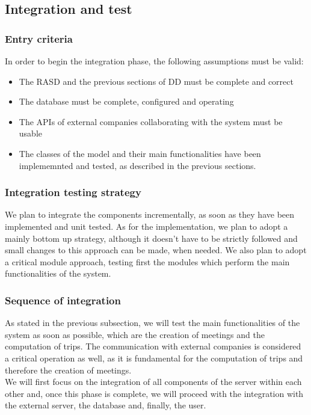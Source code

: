 \documentclass[a4paper,leqno]{article}
\begin{document}
\newpage
\subsection{Integration and test}

\subsubsection{Entry criteria}
In order to begin the integration phase, the following assumptions must be valid:

\begin{itemize}
	\item The RASD and the previous sections of DD must be complete and correct
	\item The database must be complete, configured and operating
	\item The APIs of external companies collaborating with the system must be usable
	\item The classes of the model and their main functionalities have been implememnted and tested, as described in the previous sections.
\end{itemize}

\subsubsection{Integration testing strategy}
We plan to integrate the components incrementally, as soon as they have been implemented and unit tested. As for the implementation, we plan to adopt a mainly bottom up strategy, although it doesn't have to be strictly followed and small changes to this approach can be made, when needed.
We also plan to adopt a critical module approach, testing first the modules which perform the main functionalities of the system.

\subsubsection{Sequence of integration}
As stated in the previous subsection, we will test the main functionalities of the system as soon as possible, which are the creation of meetings and the computation of trips. The communication with external companies is considered a critical operation as well, as it is fundamental for the computation of trips and therefore the creation of meetings.\\
We will first focus on the integration of all components of the server within each other and, once this phase is complete, we will proceed with the integration with the external server, the database and, finally, the user.\\
\end{document}
